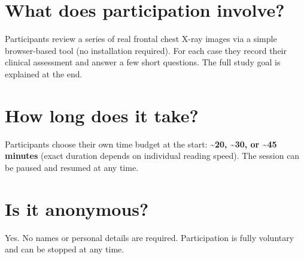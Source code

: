 \documentclass[10pt,a4paper]{article}
\begin{document}
\section{What does participation involve?}

Participants review a series of real frontal chest X-ray images via a simple browser-based tool (no installation required). For each case they record their clinical assessment and answer a few short questions. The full study goal is explained at the end.

\section{How long does it take?}

Participants choose their own time budget at the start: \textbf{\textasciitilde20, \textasciitilde30, or \textasciitilde45 minutes} (exact duration depends on individual reading speed). The session can be paused and resumed at any time.

\section{Is it anonymous?}

Yes. No names or personal details are required. Participation is fully voluntary and can be stopped at any time.

\vfill

\noindent{}
\end{document}
